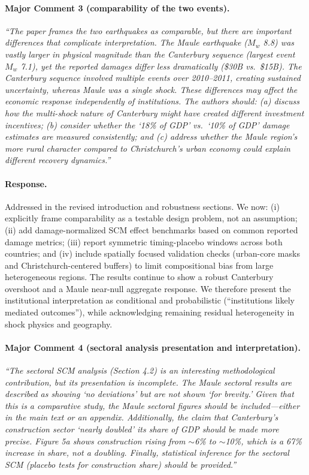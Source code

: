 \paragraph{Major Comment 3 (comparability of the two events).}
\textit{``The paper frames the two earthquakes as comparable, but there are important differences that complicate interpretation. The Maule earthquake ($M_w$ 8.8) was vastly larger in physical magnitude than the Canterbury sequence (largest event $M_w$ 7.1), yet the reported damages differ less dramatically (\$30B vs.\ \$15B). The Canterbury sequence involved multiple events over 2010--2011, creating sustained uncertainty, whereas Maule was a single shock. These differences may affect the economic response independently of institutions. The authors should: (a) discuss how the multi-shock nature of Canterbury might have created different investment incentives; (b) consider whether the `18\% of GDP' vs.\ `10\% of GDP' damage estimates are measured consistently; and (c) address whether the Maule region's more rural character compared to Christchurch's urban economy could explain different recovery dynamics.''}

\paragraph{Response.}
Addressed in the revised introduction and robustness sections. We now: (i) explicitly frame comparability as a testable design problem, not an assumption; (ii) add damage-normalized SCM effect benchmarks based on common reported damage metrics; (iii) report symmetric timing-placebo windows across both countries; and (iv) include spatially focused validation checks (urban-core masks and Christchurch-centered buffers) to limit compositional bias from large heterogeneous regions. The results continue to show a robust Canterbury overshoot and a Maule near-null aggregate response. We therefore present the institutional interpretation as conditional and probabilistic (``institutions likely mediated outcomes''), while acknowledging remaining residual heterogeneity in shock physics and geography.

\paragraph{Major Comment 4 (sectoral analysis presentation and interpretation).}
\textit{``The sectoral SCM analysis (Section 4.2) is an interesting methodological contribution, but its presentation is incomplete. The Maule sectoral results are described as showing `no deviations' but are not shown `for brevity.' Given that this is a comparative study, the Maule sectoral figures should be included---either in the main text or an appendix. Additionally, the claim that Canterbury's construction sector `nearly doubled' its share of GDP should be made more precise. Figure 5a shows construction rising from $\sim$6\% to $\sim$10\%, which is a 67\% increase in share, not a doubling. Finally, statistical inference for the sectoral SCM (placebo tests for construction share) should be provided.''}

